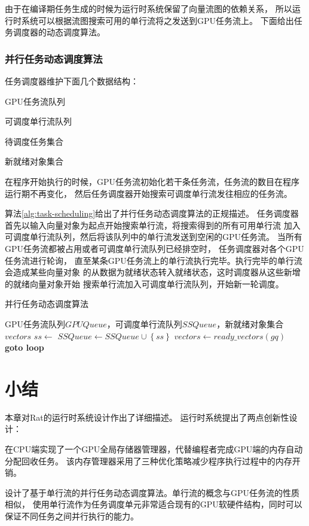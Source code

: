 由于在编译期任务生成的时候为运行时系统保留了向量流图的依赖关系，
所以运行时系统可以根据流图搜索可用的单行流将之发送到GPU任务流上。
下面给出任务调度器的动态调度算法。

\subsubsection{并行任务动态调度算法}
任务调度器维护下面几个数据结构：
\begin{compactitem}
  \item GPU任务流队列
  \item 可调度单行流队列
  \item 待调度任务集合
  \item 新就绪对象集合
\end{compactitem}

在程序开始执行的时候，GPU任务流初始化若干条任务流，任务流的数目在程序运行期不再变化，
然后任务调度器开始搜索可调度单行流发往相应的任务流。

算法\ref{alg:task-scheduling}给出了并行任务动态调度算法的正规描述。
任务调度器首先以输入向量对象为起点开始搜索单行流，将搜索得到的所有可用单行流
加入可调度单行流队列，然后将该队列中的单行流发送到空闲的GPU任务流。
当所有GPU任务流都被占用或者可调度单行流队列已经排空时，
任务调度器对各个GPU任务流进行轮询，
直至某条GPU任务流上的单行流执行完毕。执行完毕的单行流会造成某些向量对象
的从数据为就绪状态转入就绪状态，这时调度器从这些新增的就绪向量对象开始
搜索单行流加入可调度单行流队列，开始新一轮调度。

\begin{algorithm}
  \caption{并行任务动态调度算法}
  \label{alg:task-scheduling}
  \begin{algorithmic}[1]
    \Require GPU任务流队列$GPUQueue$，可调度单行流队列$SSQueue$，新就绪对象集合$vectors$
    \Loop
    \State $ss \leftarrow$ 
    \State $SSQueue \leftarrow SSQueue \cup \left\{ ss \right\}$
    \EndFor
    \State $vectors \leftarrow ready\_vectors(gq)$
    \State \textbf{goto loop} 
    \EndIf
    \EndFor
    \EndIf
    \EndLoop
    \EndFunction
  \end{algorithmic}
\end{algorithm}



\section{小结}
本章对Rat的运行时系统设计作出了详细描述。
运行时系统提出了两点创新性设计：

在CPU端实现了一个GPU全局存储器管理器，代替编程者完成GPU端的内存自动分配回收任务。
该内存管理器采用了三种优化策略减少程序执行过程中的内存开销。

设计了基于单行流的并行任务动态调度算法。单行流的概念与GPU任务流的性质相似，
使用单行流作为任务调度单元非常适合现有的GPU软硬件结构，同时可以
保证不同任务之间并行执行的能力。

